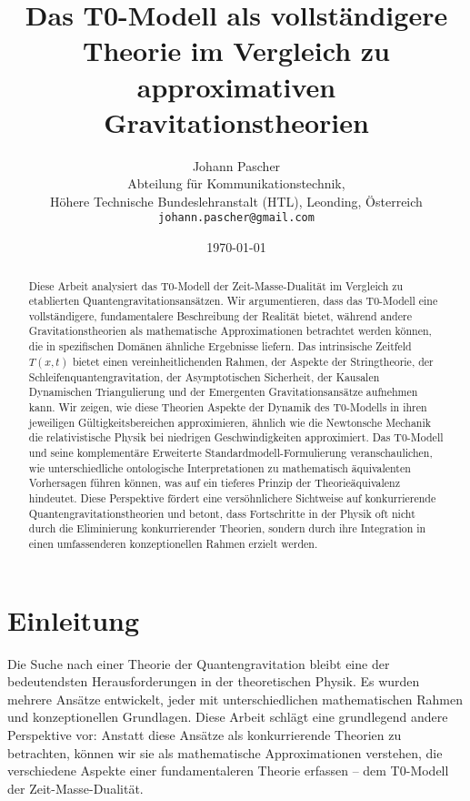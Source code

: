 \documentclass[12pt,a4paper]{article}
\newcommand{\Tfieldt}{T(x,t)}
\begin{document}
	
	\title{Das T0-Modell als vollständigere Theorie im Vergleich zu approximativen Gravitationstheorien}
	\author{Johann Pascher\\
		Abteilung für Kommunikationstechnik, \\Höhere Technische Bundeslehranstalt (HTL), Leonding, Österreich\\
		\texttt{johann.pascher@gmail.com}}
	\date{\today}
	
	\maketitle
	
	\begin{abstract}
		Diese Arbeit analysiert das T0-Modell der Zeit-Masse-Dualität im Vergleich zu etablierten Quantengravitationsansätzen. Wir argumentieren, dass das T0-Modell eine vollständigere, fundamentalere Beschreibung der Realität bietet, während andere Gravitationstheorien als mathematische Approximationen betrachtet werden können, die in spezifischen Domänen ähnliche Ergebnisse liefern. Das intrinsische Zeitfeld $\Tfieldt$ bietet einen vereinheitlichenden Rahmen, der Aspekte der Stringtheorie, der Schleifenquantengravitation, der Asymptotischen Sicherheit, der Kausalen Dynamischen Triangulierung und der Emergenten Gravitationsansätze aufnehmen kann. Wir zeigen, wie diese Theorien Aspekte der Dynamik des T0-Modells in ihren jeweiligen Gültigkeitsbereichen approximieren, ähnlich wie die Newtonsche Mechanik die relativistische Physik bei niedrigen Geschwindigkeiten approximiert. Das T0-Modell und seine komplementäre Erweiterte Standardmodell-Formulierung veranschaulichen, wie unterschiedliche ontologische Interpretationen zu mathematisch äquivalenten Vorhersagen führen können, was auf ein tieferes Prinzip der Theorieäquivalenz hindeutet. Diese Perspektive fördert eine versöhnlichere Sichtweise auf konkurrierende Quantengravitationstheorien und betont, dass Fortschritte in der Physik oft nicht durch die Eliminierung konkurrierender Theorien, sondern durch ihre Integration in einen umfassenderen konzeptionellen Rahmen erzielt werden.
	\end{abstract}
	\newpage
	\tableofcontents
	\newpage
	\section{Einleitung}
	\label{sec:introduction}
	
	Die Suche nach einer Theorie der Quantengravitation bleibt eine der bedeutendsten Herausforderungen in der theoretischen Physik. Es wurden mehrere Ansätze entwickelt, jeder mit unterschiedlichen mathematischen Rahmen und konzeptionellen Grundlagen. Diese Arbeit schlägt eine grundlegend andere Perspektive vor: Anstatt diese Ansätze als konkurrierende Theorien zu betrachten, können wir sie als mathematische Approximationen verstehen, die verschiedene Aspekte einer fundamentaleren Theorie erfassen – dem T0-Modell der Zeit-Masse-Dualität.
	
\end{document}
